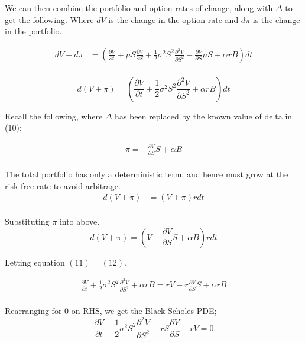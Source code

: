 \documentclass[12pt]{article}
\begin{document}
We can then combine the portfolio and option rates of change, along with $\Delta$ to get the following. Where $dV$ is the change in the option rate and $d \pi$ is the change in the portfolio.

\begin{align*}
dV + d \pi &= \left(\frac{\partial V}{\partial t} + \mu S \frac{\partial V}{\partial S} + \frac{1}{2}\sigma^2 S^2 \frac{\partial ^2 V}{\partial S^2} - \frac{\partial V}{\partial S}\mu S + \alpha rB\right)dt \\
\end{align*}

\begin{equation}
d(V + \pi) = \left(\frac{\partial V}{\partial t} + \frac{1}{2}\sigma^2 S^2 \frac{\partial ^2 V}{\partial S^2} + \alpha rB\right)dt
\end{equation}

Recall the following, where $\Delta$ has been replaced by the known value of delta in (10);

\begin{align*}
\pi = -\frac{\partial V}{\partial S}S + \alpha B \\
\end{align*}

The total portfolio has only a deterministic term, and hence must grow at the risk free rate to avoid arbitrage. 
\begin{align*}
d(V + \pi) &= (V + \pi)rdt \\
\end{align*}

Substituting $\pi$ into above.
\begin{equation}
d(V + \pi) = \left(V - \frac{\partial V}{\partial S}S + \alpha B\right)rdt
\end{equation}

Letting equation $(11) = (12)$.

\begin{align*}
\frac{\partial V}{\partial t} + \frac{1}{2}\sigma^2 S^2 \frac{\partial ^2 V}{\partial S^2}+\alpha rB = rV - r \frac{\partial V}{\partial S}S + \alpha rB \\
\end{align*}

Rearranging for 0 on RHS, we get the Black Scholes PDE;
\begin{equation}
\frac{\partial V}{\partial t} + \frac{1}{2}\sigma^2 S^2 \frac{\partial ^2 V}{\partial S^2} + rS \frac{\partial V}{\partial S} - rV = 0
\end{equation}
\end{document}
